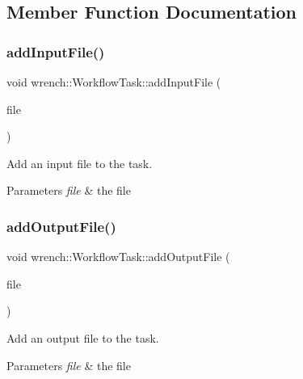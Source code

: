 \subsection{Member Function Documentation}
\mbox{\label{classwrench_1_1_workflow_task_a3498047afb74ea6ce2132d44f8c678e8}} 
\subsubsection{\texorpdfstring{add\+Input\+File()}{addInputFile()}}
{\footnotesize\ttfamily void wrench\+::\+Workflow\+Task\+::add\+Input\+File (\begin{DoxyParamCaption}\item[{\hyperlink{classwrench_1_1_workflow_file}{Workflow\+File} $\ast$}]{file }\end{DoxyParamCaption})}



Add an input file to the task. 


\begin{DoxyParams}{Parameters}
{\em file} & the file \\
\hline
\end{DoxyParams}
\mbox{\label{classwrench_1_1_workflow_task_ac774b4fddc07753f5fc7daa31ae28fd3}} 
\subsubsection{\texorpdfstring{add\+Output\+File()}{addOutputFile()}}
{\footnotesize\ttfamily void wrench\+::\+Workflow\+Task\+::add\+Output\+File (\begin{DoxyParamCaption}\item[{\hyperlink{classwrench_1_1_workflow_file}{Workflow\+File} $\ast$}]{file }\end{DoxyParamCaption})}



Add an output file to the task. 


\begin{DoxyParams}{Parameters}
{\em file} & the file \\
\hline
\end{DoxyParams}
\mbox{\label{classwrench_1_1_workflow_task_a4e32ce5d0da237ad01b8a1c1154bb86e}} 
